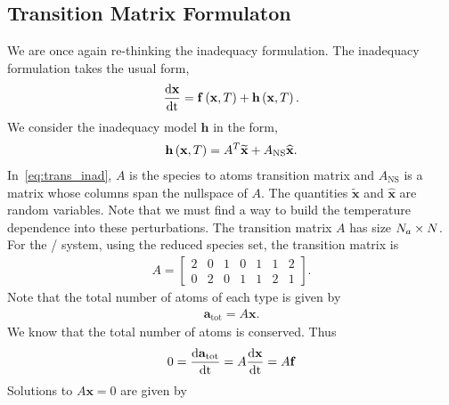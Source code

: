 \subsection{Transition Matrix Formulaton}
We are once again re-thinking the inadequacy formulation.  The inadequacy 
formulation takes the usual form,
\begin{align}
  \frac{\mathrm{d} \mathbf{x}}{\mathrm{d} \mathrm{t}} = \mathbf{f}\left(\mathbf{x}, T\right) + \mathbf{h}\left(\mathbf{x}, T\right).
\end{align}
We consider the inadequacy model $\mathbf{h}$ in the form,
\begin{align}
  \mathbf{h}\left(\mathbf{x}, T\right) = A^{T}\widetilde{\mathbf{x}} + A_{\textrm{NS}}\widehat{\mathbf{x}}.
  \label{eq:trans_inad}
\end{align}
In~\eqref{eq:trans_inad}, $A$ is the species to atoms transition matrix and 
$A_{\textrm{NS}}$ is a matrix whose columns span the nullspace of $A$.  The quantities 
$\widetilde{\mathbf{x}}$ and $\widehat{\mathbf{x}}$ are random variables. 
Note that we must find a way to build the temperature dependence into 
these perturbations.  The transition matrix $A$ has size $N_{a}\times N$. 
For the / system, using the reduced species set, the 
transition matrix is
\begin{align}
  A = 
  \begin{bmatrix}
    2 & 0 & 1 & 0 & 1 & 1 & 2 \\
    0 & 2 & 0 & 1 & 1 & 2 & 1
  \end{bmatrix}.
\end{align}
Note that the total number of atoms of each type is given by 
\begin{align}
  \mathbf{a}_{\textrm{tot}} = A\mathbf{x}.
\end{align}
We know that the total number of atoms is conserved.
Thus
\begin{align}
  0 = \frac{\mathrm{d} \mathbf{a}_{\textrm{tot}}}{\mathrm{d} \mathrm{t}} = 
  A \frac{\mathrm{d} \mathbf{x}}{\mathrm{d} \mathrm{t}} = A\mathbf{f}
\end{align}
Solutions to $A\mathbf{x} = 0$ are given by 
